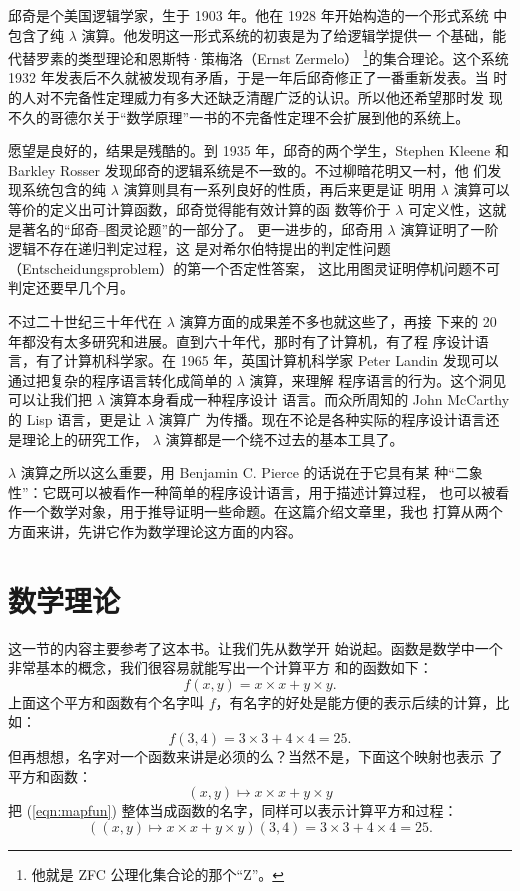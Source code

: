\documentclass[a4paper,adobefonts]{ctexart}
\theoremstyle{definition}
\begin{document}
邱奇是个美国逻辑学家，生于 1903 年。他在 1928 年开始构造的一个形式系统
中包含了纯 $\lambda$ 演算。他发明这一形式系统的初衷是为了给逻辑学提供一
个基础，能代替罗素的类型理论和恩斯特·策梅洛（Ernst Zermelo）
\footnote{他就是 ZFC 公理化集合论的那个``Z''。}的集合理论。这个系统
1932 年发表后不久就被发现有矛盾，于是一年后邱奇修正了一番重新发表。当
时的人对不完备性定理威力有多大还缺乏清醒广泛的认识。所以他还希望那时发
现不久的哥德尔关于``数学原理''一书的不完备性定理不会扩展到他的系统上。

愿望是良好的，结果是残酷的。到 1935 年，邱奇的两个学生，Stephen Kleene
和 Barkley Rosser 发现邱奇的逻辑系统是不一致的。不过柳暗花明又一村，他
们发现系统包含的纯 $\lambda$ 演算则具有一系列良好的性质，再后来更是证
明用 $\lambda$ 演算可以等价的定义出可计算函数，邱奇觉得能有效计算的函
数等价于 $\lambda$ 可定义性，这就是著名的``邱奇--图灵论题''的一部分了。
更一进步的，邱奇用 $\lambda$ 演算证明了一阶逻辑不存在递归判定过程，这
是对希尔伯特提出的判定性问题（Entscheidungsproblem）的第一个否定性答案，
这比用图灵证明停机问题不可判定还要早几个月。

不过二十世纪三十年代在 $\lambda$ 演算方面的成果差不多也就这些了，再接
下来的 20 年都没有太多研究和进展。直到六十年代，那时有了计算机，有了程
序设计语言，有了计算机科学家。在 1965 年，英国计算机科学家 Peter
Landin 发现可以通过把复杂的程序语言转化成简单的 $\lambda$ 演算，来理解
程序语言的行为。这个洞见可以让我们把 $\lambda$ 演算本身看成一种程序设计
语言。而众所周知的 John McCarthy 的 Lisp 语言，更是让 $\lambda$ 演算广
为传播。现在不论是各种实际的程序设计语言还是理论上的研究工作，
$\lambda$ 演算都是一个绕不过去的基本工具了。

$\lambda$ 演算之所以这么重要，用 Benjamin C. Pierce 的话说在于它具有某
种``二象性''：它既可以被看作一种简单的程序设计语言，用于描述计算过程，
也可以被看作一个数学对象，用于推导证明一些命题。在这篇介绍文章里，我也
打算从两个方面来讲，先讲它作为数学理论这方面的内容。

\section{数学理论}
这一节的内容主要参考了这本书\cite{hindley2008lambda}。让我们先从数学开
始说起。函数是数学中一个非常基本的概念，我们很容易就能写出一个计算平方
和的函数如下：
\begin{equation}
  f(x,y) = x\times x + y\times y.
\end{equation}
上面这个平方和函数有个名字叫 $f$，有名字的好处是能方便的表示后续的计算，比如：
$$
f(3,4) = 3\times 3 + 4 \times 4 = 25.
$$但再想想，名字对一个函数来讲是必须的么？当然不是，下面这个映射也表示
了平方和函数：
\begin{equation}\label{eqn:mapfun}
  (x,y)\mapsto x\times x + y\times y
\end{equation}
把 (\ref{eqn:mapfun}) 整体当成函数的名字，同样可以表示计算平方和过程：
$$
((x,y)\mapsto x\times x + y\times y)(3,4)=3\times 3 + 4\times 4 = 25.
$$
\end{document}
